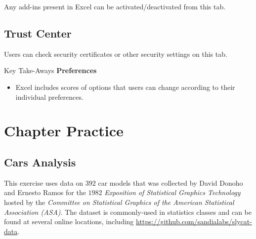 Any add-ins present in Excel can be activated/deactivated from this tab.

\subsection{Trust Center}

Users can check security certificates or other security settings on this tab.

\begin{center}
	\begin{tkwbox}{Key Take-Aways}
		\textbf{Preferences}
		\\
		\begin{itemize}
			\setlength{\itemsep}{0pt}
			\setlength{\parskip}{0pt}
			\setlength{\parsep}{0pt}
			
			\item Excel includes scores of options that users can change according to their individual preferences.
			
		\end{itemize}
	\end{tkwbox}
\end{center}

\section{Chapter Practice}

\subsection{Cars Analysis}

This exercise uses data on $ 392 $ car models that was collected by David Donoho and Ernesto Ramos for the $ 1982 $ \textit{Exposition of Statistical Graphics Technology} hosted by the \textit{Committee on Statistical Graphics of the American Statistical Association (ASA)}. The dataset is commonly-used in statistics classes and can be found at several online locations, including \url{https://github.com/sandialabs/slycat-data}.

